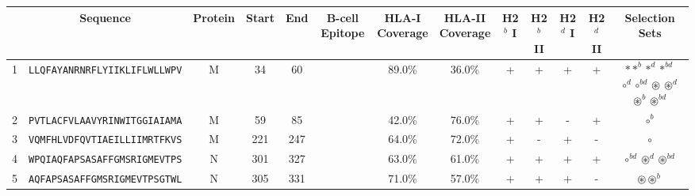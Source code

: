 \begin{tabular}{rcccccccccccc}
\toprule
{} &                              Sequence & Protein &  Start &   End & B-cell Epitope & \Centerstack{HLA-I \\ Coverage} & \Centerstack{HLA-II \\ Coverage} & H2$^{b}$ I & H2$^{b}$ II & H2$^{d}$ I & H2$^{d}$ II &                                                                                                                           Selection Sets \\
\midrule
1  &  \texttt{LLQFAYANRNRFLYIIKLIFLWLLWPV} &       M &     34 &    60 &                &                          89.0\% &                           36.0\% &          + &           + &          + &           + &  \Centerstack{  $\ast \ast^b \ast^d \ast^{bd}$ \\  $\circ^d \circ^{bd} \circledast \circledast^d$ \\  $\circledast^b \circledast^{bd}$ } \\
2  &  \texttt{PVTLACFVLAAVYRINWITGGIAIAMA} &       M &     59 &    85 &                &                          42.0\% &                           76.0\% &          + &           + &          - &           + &                                                                                                                              $ \circ^b $ \\
3  &  \texttt{VQMFHLVDFQVTIAEILLIIMRTFKVS} &       M &    221 &   247 &                &                          64.0\% &                           72.0\% &          + &           - &          + &           - &                                                                                                                                $ \circ $ \\
4  &  \texttt{WPQIAQFAPSASAFFGMSRIGMEVTPS} &       N &    301 &   327 &                &                          63.0\% &                           61.0\% &          + &           + &          + &           + &                                                                                            $ \circ^{bd} \circledast^d \circledast^{bd} $ \\
5  &  \texttt{AQFAPSASAFFGMSRIGMEVTPSGTWL} &       N &    305 &   331 &                &                          71.0\% &                           57.0\% &          + &           + &          + &           - &                                                                                                            $ \circledast \circledast^b $ \\

\end{tabular}
